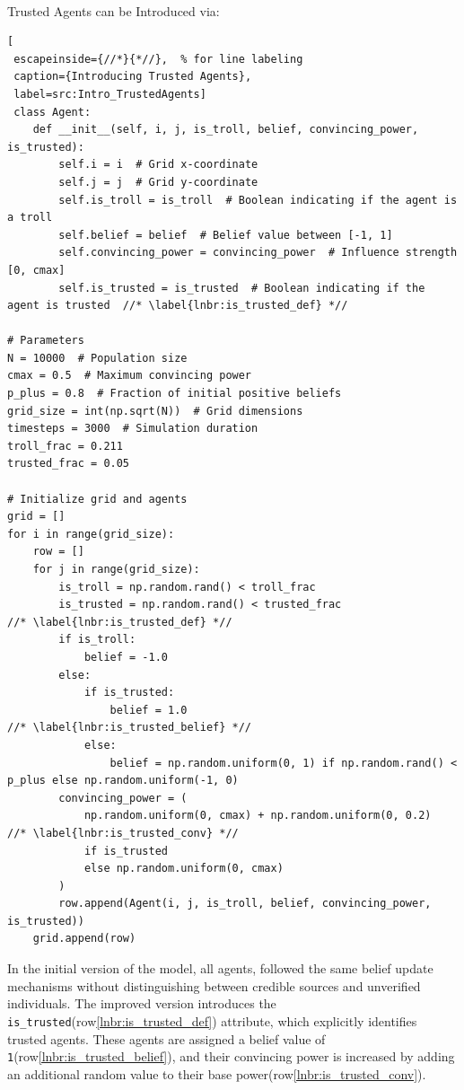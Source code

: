 \documentclass[a4paper,11pt]{scrartcl}
\begin{document}
\paragraph{}Trusted Agents can be Introduced  via:
\begin{lstlisting}[
 escapeinside={//*}{*//},  % for line labeling
 caption={Introducing Trusted Agents},
 label=src:Intro_TrustedAgents]
 class Agent:
    def __init__(self, i, j, is_troll, belief, convincing_power, is_trusted):
        self.i = i  # Grid x-coordinate
        self.j = j  # Grid y-coordinate
        self.is_troll = is_troll  # Boolean indicating if the agent is a troll
        self.belief = belief  # Belief value between [-1, 1]
        self.convincing_power = convincing_power  # Influence strength [0, cmax]
        self.is_trusted = is_trusted  # Boolean indicating if the agent is trusted  //* \label{lnbr:is_trusted_def} *//

# Parameters
N = 10000  # Population size
cmax = 0.5  # Maximum convincing power
p_plus = 0.8  # Fraction of initial positive beliefs
grid_size = int(np.sqrt(N))  # Grid dimensions
timesteps = 3000  # Simulation duration
troll_frac = 0.211
trusted_frac = 0.05

# Initialize grid and agents
grid = []
for i in range(grid_size):
    row = []
    for j in range(grid_size):
        is_troll = np.random.rand() < troll_frac
        is_trusted = np.random.rand() < trusted_frac                     //* \label{lnbr:is_trusted_def} *//
        if is_troll:
            belief = -1.0
        else:
            if is_trusted:
                belief = 1.0                                             //* \label{lnbr:is_trusted_belief} *//
            else:
                belief = np.random.uniform(0, 1) if np.random.rand() < p_plus else np.random.uniform(-1, 0)
        convincing_power = (
            np.random.uniform(0, cmax) + np.random.uniform(0, 0.2)       //* \label{lnbr:is_trusted_conv} *//
            if is_trusted
            else np.random.uniform(0, cmax)
        )
        row.append(Agent(i, j, is_troll, belief, convincing_power, is_trusted))
    grid.append(row)
\end{lstlisting}   

In the initial version of the model, all agents, followed the same belief update mechanisms without distinguishing between credible sources and unverified individuals. The improved version introduces the \verb|is_trusted|(row\ref{lnbr:is_trusted_def}) attribute, which explicitly identifies trusted agents. These agents are assigned a belief value of \verb|1|(row\ref{lnbr:is_trusted_belief}), and their convincing power is increased by adding an additional random value to their base power(row\ref{lnbr:is_trusted_conv}). 
\end{document}
